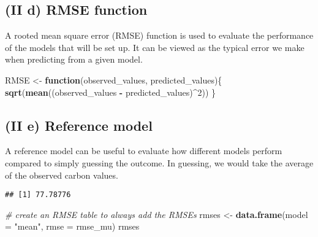 \documentclass[
]{article}
\newenvironment{Shaded}{\begin{snugshade}}{\end{snugshade}}
\newcommand{\CommentTok}[1]{\textcolor[rgb]{0.56,0.35,0.01}{\textit{#1}}}
\newcommand{\ControlFlowTok}[1]{\textcolor[rgb]{0.13,0.29,0.53}{\textbf{#1}}}
\newcommand{\DataTypeTok}[1]{\textcolor[rgb]{0.13,0.29,0.53}{#1}}
\newcommand{\DecValTok}[1]{\textcolor[rgb]{0.00,0.00,0.81}{#1}}
\newcommand{\KeywordTok}[1]{\textcolor[rgb]{0.13,0.29,0.53}{\textbf{#1}}}
\newcommand{\NormalTok}[1]{#1}
\newcommand{\OperatorTok}[1]{\textcolor[rgb]{0.81,0.36,0.00}{\textbf{#1}}}
\newcommand{\StringTok}[1]{\textcolor[rgb]{0.31,0.60,0.02}{#1}}
\begin{document}
\hypertarget{ii-d-rmse-function}{%
\subsection{(II d) RMSE function}\label{ii-d-rmse-function}}

A rooted mean square error (RMSE) function is used to evaluate the
performance of the models that will be set up. It can be viewed as the
typical error we make when predicting from a given model.

\begin{Shaded}
\begin{Highlighting}[]
\NormalTok{RMSE <{-}}\StringTok{ }\ControlFlowTok{function}\NormalTok{(observed\_values, predicted\_values)\{}
  \KeywordTok{sqrt}\NormalTok{(}\KeywordTok{mean}\NormalTok{((observed\_values }\OperatorTok{{-}}\StringTok{ }\NormalTok{predicted\_values)}\OperatorTok{\^{}}\DecValTok{2}\NormalTok{))}
\NormalTok{\}}
\end{Highlighting}
\end{Shaded}

\hypertarget{ii-e-reference-model}{%
\subsection{(II e) Reference model}\label{ii-e-reference-model}}

A reference model can be useful to evaluate how different models perform
compared to simply guessing the outcome. In guessing, we would take the
average of the observed carbon values.

\begin{Shaded}
\end{Shaded}

\begin{verbatim}
## [1] 77.78776
\end{verbatim}

\begin{Shaded}
\begin{Highlighting}[]
\CommentTok{\# create an RMSE table to always add the RMSEs}
\NormalTok{rmses <{-}}\StringTok{ }\KeywordTok{data.frame}\NormalTok{(}\DataTypeTok{model =} \StringTok{"mean"}\NormalTok{, }\DataTypeTok{rmse =}\NormalTok{ rmse\_mu)}
\NormalTok{rmses}
\end{Highlighting}
\end{Shaded}
\end{document}
